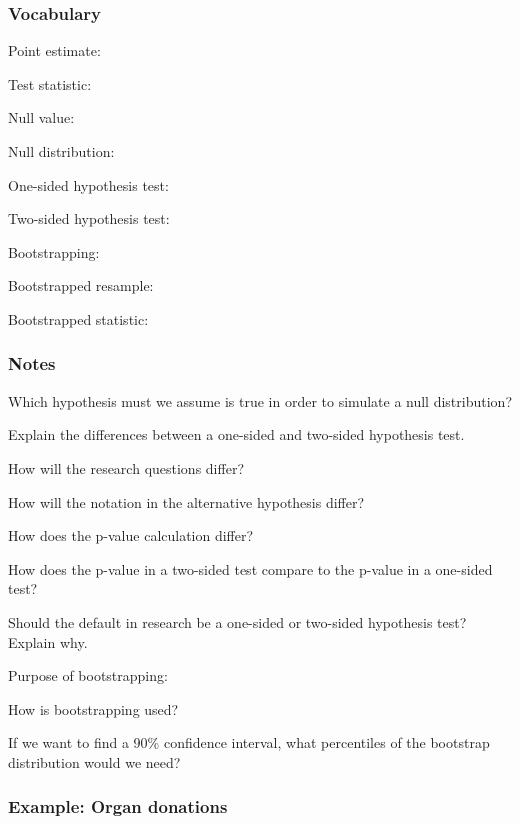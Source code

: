 \documentclass[
]{report}
\newcommand{\rgs}{\vspace{12pt}} %
\newcommand{\rgi}{\hspace{24pt}}  %
\begin{document}
\hypertarget{vocabulary-10}{%
\subsubsection*{Vocabulary}\label{vocabulary-10}}

Point estimate:
\rgs

Test statistic:
\rgs

Null value:
\rgs

Null distribution:
\rgs

One-sided hypothesis test:
\rgs

Two-sided hypothesis test:
\rgs

Bootstrapping:
\rgs

Bootstrapped resample:
\rgs

Bootstrapped statistic:
\rgs

\hypertarget{notes-15}{%
\subsubsection*{Notes}\label{notes-15}}

Which hypothesis must we assume is true in order to simulate a null distribution?
\rgs

Explain the differences between a one-sided and two-sided hypothesis test.
\vspace{1mm}

\rgi How will the research questions differ?
\rgs

\rgi How will the notation in the alternative hypothesis differ?
\rgs

\rgi How does the p-value calculation differ?
\rgs

How does the p-value in a two-sided test compare to the p-value in a one-sided test?
\rgs

Should the default in research be a one-sided or two-sided hypothesis test? Explain why.
\rgs
\rgs

Purpose of bootstrapping:
\rgs

How is bootstrapping used?\\
\rgs

If we want to find a 90\% confidence interval, what percentiles of the bootstrap distribution would we need?\\
\rgs

\hypertarget{example-organ-donations}{%
\subsubsection*{Example: Organ donations}\label{example-organ-donations}}
\end{document}
